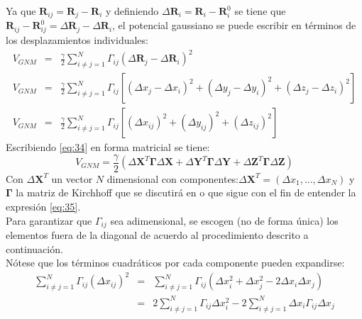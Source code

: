 Ya que $\textbf{R}_{ij}=\textbf{R}_{j}-\textbf{R}_{i}$ y definiendo $\Delta\textbf{R}_{i}=\textbf{R}_{i}-\textbf{R}_{i}^0$ se tiene que  $\textbf{R}_{ij}-\textbf{R}_{ij}^0=\Delta\textbf{R}_{j}-\Delta\textbf{R}_{i}$, el potencial gaussiano se puede escribir en t\'{e}rminos de los desplazamientos individuales:
\begin{eqnarray}\label{eq:34}
V_{GNM}&=&\frac{\gamma}{2}\sum_{i\neq j=1}^{N}\Gamma_{ij}\left( \Delta\textbf{R}_{j}-\Delta\textbf{R}_{i}\right)^2 \nonumber \\
V_{GNM}&=&\frac{\gamma}{2}\sum_{i\neq j=1}^{N}\Gamma_{ij}\left[\left(\Delta x_j-\Delta x_i \right)^2+\left(\Delta y_j-\Delta y_i \right)^2+\left(\Delta z_j-\Delta z_i \right)^2 \right] \nonumber \\
V_{GNM}&=&\frac{\gamma}{2}\sum_{i\neq j=1}^{N}\Gamma_{ij}\left[\left(\Delta x_{ij}\right)^2+\left(\Delta y_{ij}\right)^2+\left(\Delta z_{ij}\right)^2 \right]
\end{eqnarray}
Escribiendo \eqref{eq:34} en forma matricial se tiene:
\begin{equation}\label{eq:35}
V_{GNM}=\frac{\gamma}{2}\left(\Delta\mathbf{X}^T\mathbf{\Gamma}\Delta\mathbf{X}+\Delta\mathbf{Y}^T\mathbf{\Gamma}\Delta\mathbf{Y}+\Delta\mathbf{Z}^T\mathbf{\Gamma}\Delta\mathbf{Z} \right)
\end{equation}
Con $\Delta\mathbf{X}^T$ un vector $N$ dimensional con componentes:$\Delta\mathbf{X}^T=\left(\Delta x_1,...,\Delta x_N\right)$ y $\mathbf{\Gamma}$ la matriz de Kirchhoff que se discutir\'{a} en o que sigue con el fin de entender la expresi\'{o}n \eqref{eq:35}.\\

Para garantizar que $\Gamma_{ij}$ sea adimensional, se escogen (no de forma \'{u}nica) los elementos fuera de la diagonal de acuerdo al procedimiento descrito a continuaci\'{o}n.\\

N\'{o}tese que los t\'{e}rminos cuadr\'{a}ticos por cada componente pueden expandirse:
\begin{eqnarray}\label{eq:36}
\sum_{i\neq j=1}^{N}\Gamma_{ij}\left(\Delta x_{ij}\right)^2&=&\sum_{i\neq j=1}^{N}\Gamma_{ij}\left(\Delta x_{i}^2+\Delta x_{j}^2-2\Delta x_{i}\Delta x_{j}\right) \nonumber \\
&=&2\sum_{i\neq j=1}^{N}\Gamma_{ij}\Delta x_{i}^2-2\sum_{i\neq j=1}^{N}\Delta x_{i}\Gamma_{ij}\Delta x_{j}
\end{eqnarray}


